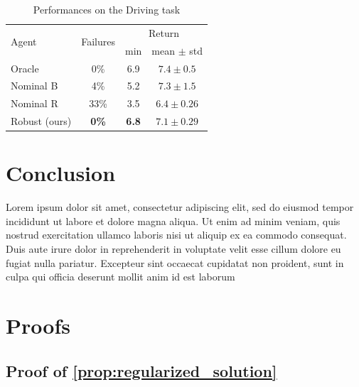 \documentclass{article}
\begin{document}
\begin{table}[htbp]
	\caption{Performances on the Driving task}
	\label{tab:driving}
	\centering
	\begin{tabular}{lccc}
		\toprule
		\multirow{2}{*}{Agent} &
		\multirow{2}{*}{Failures} &
		\multicolumn{2}{c}{Return} \\
		\cmidrule{3-4} && min &
		mean $\pm$ std  \\
		\midrule
		Oracle & 0\% & {6.9} & $7.4 \pm 0.5$ \\
		\midrule
		{Nominal B} & 4\% & {5.2} & $\mathbf{7.3} \pm 1.5$ \\
		{Nominal R} & 33\% & {3.5} & $6.4 \pm 0.26$ \\
		Robust (ours) & \textbf{0\%} & \textbf{6.8} & $7.1 \pm 0.29$ \\
		\bottomrule
	\end{tabular}
\end{table}

\section*{Conclusion}


Lorem ipsum dolor sit amet, consectetur adipiscing elit, sed do eiusmod tempor incididunt ut labore et dolore magna aliqua. Ut enim ad minim veniam, quis nostrud exercitation ullamco laboris nisi ut aliquip ex ea commodo consequat. Duis aute irure dolor in reprehenderit in voluptate velit esse cillum dolore eu fugiat nulla pariatur. Excepteur sint occaecat cupidatat non proident, sunt in culpa qui officia deserunt mollit anim id est laborum





\clearpage
\appendix

\section{Proofs}

\subsection{Proof of \autoref{prop:regularized_solution}}
\end{document}
